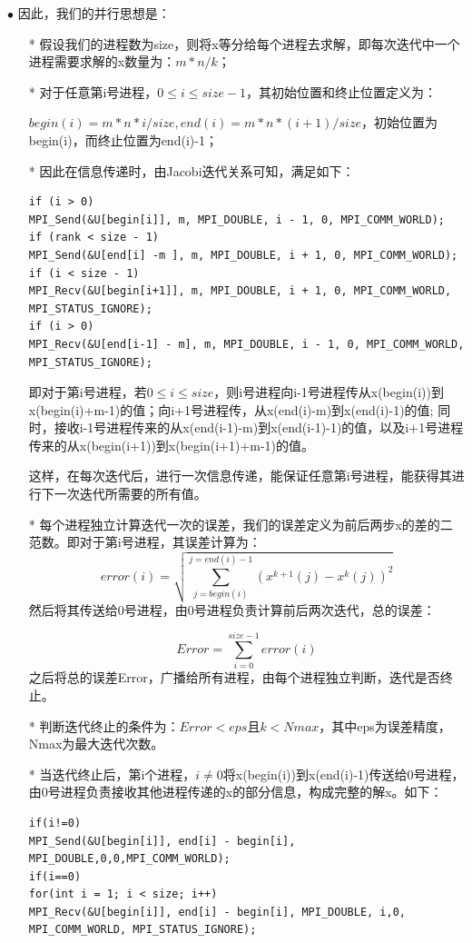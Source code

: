 \documentclass[a4paper,11pt]{ctexart} %
\begin{document}
$\bullet$ 因此，我们的并行思想是：\par
\begin{itemize}
\item[*] 假设我们的进程数为size，则将x等分给每个进程去求解，即每次迭代中一个进程需要求解的x数量为：$m*n/k$；
\item[*] 对于任意第i号进程，$0\leq i\leq size-1$，其初始位置和终止位置定义为：\par
$begin(i)=m*n*i/size,end(i)=m*n*(i+1)/size$，初始位置为begin(i)，而终止位置为end(i)-1；
\item[*] 因此在信息传递时，由Jacobi迭代关系可知，满足如下：\par
\begin{scriptsize}
\begin{lstlisting}
if (i > 0)
MPI_Send(&U[begin[i]], m, MPI_DOUBLE, i - 1, 0, MPI_COMM_WORLD);
if (rank < size - 1)
MPI_Send(&U[end[i] -m ], m, MPI_DOUBLE, i + 1, 0, MPI_COMM_WORLD);
if (i < size - 1)
MPI_Recv(&U[begin[i+1]], m, MPI_DOUBLE, i + 1, 0, MPI_COMM_WORLD, MPI_STATUS_IGNORE);    
if (i > 0)
MPI_Recv(&U[end[i-1] - m], m, MPI_DOUBLE, i - 1, 0, MPI_COMM_WORLD, MPI_STATUS_IGNORE);  
\end{lstlisting}
\end{scriptsize}
即对于第i号进程，若$0 \leq i\leq size$，则i号进程向i-1号进程传从x(begin(i))到x(begin(i)+m-1)的值；向i+1号进程传，从x(end(i)-m)到x(end(i)-1)的值;
同时，接收i-1号进程传来的从x(end(i-1)-m)到x(end(i-1)-1)的值，以及i+1号进程传来的从x(begin(i+1))到x(begin(i+1)+m-1)的值。\par
这样，在每次迭代后，进行一次信息传递，能保证任意第i号进程，能获得其进行下一次迭代所需要的所有值。
\item[*] 每个进程独立计算迭代一次的误差，我们的误差定义为前后两步x的差的二范数。即对于第i号进程，其误差计算为：
\begin{equation*}
error(i)=\sqrt{\sum_{j=begin(i)}^{j=end(i)-1}(x^{k+1}(j)-x^k(j))^2}
\end{equation*}
然后将其传送给0号进程，由0号进程负责计算前后两次迭代，总的误差：\par
\begin{equation*}
Error=\sum_{i=0}^{size-1}error(i)
\end{equation*}
之后将总的误差Error，广播给所有进程，由每个进程独立判断，迭代是否终止。
\item[*] 判断迭代终止的条件为：$Error<eps$且$k<Nmax$，其中eps为误差精度，Nmax为最大迭代次数。
\item[*] 当迭代终止后，第i个进程，$i\neq 0$将x(begin(i))到x(end(i)-1)传送给0号进程，由0号进程负责接收其他进程传递的x的部分信息，构成完整的解x。如下：\par
\begin{scriptsize}
\begin{lstlisting}
if(i!=0)
MPI_Send(&U[begin[i]], end[i] - begin[i], MPI_DOUBLE,0,0,MPI_COMM_WORLD);  
if(i==0)
for(int i = 1; i < size; i++)
MPI_Recv(&U[begin[i]], end[i] - begin[i], MPI_DOUBLE, i,0, MPI_COMM_WORLD, MPI_STATUS_IGNORE);   
\end{lstlisting}
\end{scriptsize}
\end{itemize}
\end{document}
